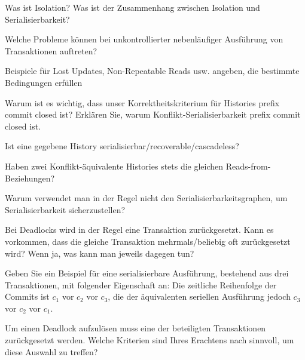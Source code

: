 \begin{fragen}
	\begin{enumeration}
		\item Was ist Isolation? Was ist der Zusammenhang zwischen Isolation und Serialisierbarkeit?
		\item Welche Probleme können bei unkontrollierter nebenläufiger Ausführung von Transaktionen auftreten?
		\item Beispiele für Lost Updates, Non-Repeatable Reads usw. angeben, die bestimmte Bedingungen erfüllen
		\item Warum ist es wichtig, dass unser Korrektheitskriterium für Histories prefix commit closed ist? Erklären Sie, warum Konflikt-Serialisierbarkeit prefix commit closed ist.
		\item Ist eine gegebene History serialisierbar/recoverable/cascadeless?
		\item Haben zwei Konflikt-äquivalente Histories stets die gleichen Reads-from-Beziehungen?
		\item Warum verwendet man in der Regel nicht den Serialisierbarkeitsgraphen, um Serialisierbarkeit sicherzustellen?
		\item Bei Deadlocks wird in der Regel eine Transaktion zurückgesetzt. Kann es vorkommen, dass die gleiche Transaktion mehrmals/beliebig oft zurückgesetzt wird? Wenn ja, was kann man jeweils dagegen tun?
		\item Geben Sie ein Beispiel für eine serialisierbare Ausführung, bestehend aus drei Transaktionen, mit folgender Eigenschaft an: Die zeitliche Reihenfolge der Commits ist \( c_1 \) vor \( c_2 \) vor \( c_3 \), die der äquivalenten seriellen Ausführung jedoch \( c_3 \) vor \( c_2 \) vor \( c_1 \).
		\item Um einen Deadlock aufzulösen muss eine der beteiligten Transaktionen zurückgesetzt werden. Welche Kriterien sind Ihres Erachtens nach sinnvoll, um diese Auswahl zu treffen?
	\end{enumeration}
\end{fragen}